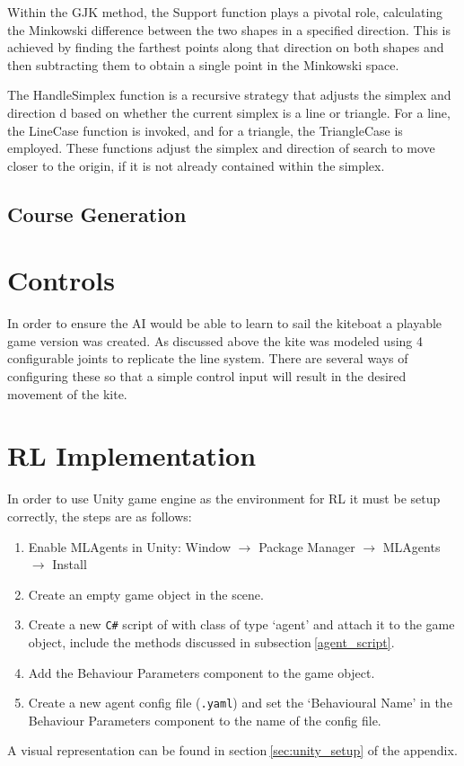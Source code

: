 Within the GJK method, the Support function plays a pivotal role, calculating the Minkowski difference between the two shapes in a specified direction. This is achieved by finding the farthest points along that direction on both shapes and then subtracting them to obtain a single point in the Minkowski space.

The HandleSimplex function is a recursive strategy that adjusts the simplex and direction d based on whether the current simplex is a line or triangle. For a line, the LineCase function is invoked, and for a triangle, the TriangleCase is employed. These functions adjust the simplex and direction of search to move closer to the origin, if it is not already contained within the simplex.

\subsection{Course Generation}


\section{Controls}
In order to ensure the AI would be able to learn to sail the kiteboat a playable game version was created. As discussed above the kite was modeled using 4 configurable joints to replicate the line system. There are several ways of configuring these so that a simple control input will result in the desired movement of the kite. 



\section{RL Implementation}\label{sec:RL_Implementation}

In order to use Unity game engine as the environment for RL it must be setup correctly, the steps are as follows:
\begin{enumerate}
    \item Enable MLAgents in Unity:
    Window $\rightarrow$ Package Manager $\rightarrow$ MLAgents $\rightarrow$ Install
    \item Create an empty game object in the scene.
    \item Create a new \texttt{C\#} script of with class of type `agent' and attach it to the game object, include the methods discussed in subsection$~$\ref{agent_script}.
    \item Add the Behaviour Parameters component to the game object.
    \item Create a new agent config file (\texttt{.yaml}) and set the `Behavioural Name' in the Behaviour Parameters component to the name of the config file.
\end{enumerate}  
A visual representation can be found in section$~$\ref{sec:unity_setup} of the appendix.

